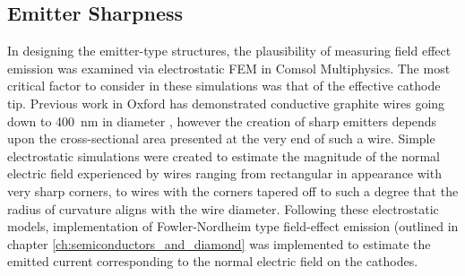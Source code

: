 \begin{refsection}

\subsection{Emitter Sharpness}
\label{subsec:emitter_sharpness}
In designing the emitter-type structures, the plausibility of measuring field effect emission was examined via electrostatic FEM in Comsol Multiphysics. The most critical factor to consider in these simulations was that of the effective cathode tip. Previous work in Oxford has demonstrated conductive graphite wires going down to 400~\si{\nano\metre} in diameter \cite{sun2014}, however the creation of sharp emitters depends upon the cross-sectional area presented at the very end of such a wire. Simple electrostatic simulations were created to estimate the magnitude of the normal electric field experienced by wires ranging from rectangular in appearance with very sharp corners, to wires with the corners tapered off to such a degree that the radius of curvature aligns with the wire diameter. Following these electrostatic models, implementation of Fowler-Nordheim type field-effect emission (outlined in chapter \ref{ch:semiconductors_and_diamond} was implemented to estimate the emitted current corresponding to the normal electric field on the cathodes.


\end{refsection}
